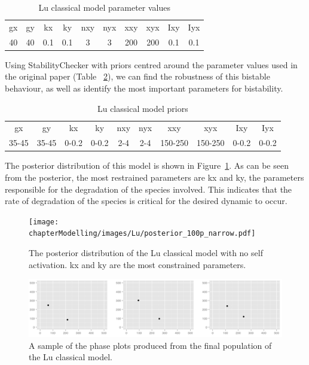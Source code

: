 \begin{table}[p]
\centering
\caption{Lu classical model parameter values}
\label{tab:lu_cl_bi}
\begin{tabular}{cccccccccc}
gx    & gy    & kx    & ky    & nxy & nyx & xxy     & xyx     & Ixy   & Iyx \\
40&40     &0.1   & 0.1   &  3  &  3  &  200    &  200    & 0.1    &   0.1
\end{tabular}
\end{table}
\clearpage

Using StabilityChecker with priors centred around the parameter values used in the original paper (Table ~\ref{tab:lu}), we can find the robustness of this bistable behaviour, as well as identify the most important parameters for bistability. 
\begin{table}[h]
\centering
\caption{Lu classical model priors}
\label{tab:lu}
\begin{tabular}{cccccccccc}
gx    & gy    & kx    & ky    & nxy & nyx & xxy     & xyx     & Ixy   & Iyx \\
35-45 & 35-45 & 0-0.2 & 0-0.2 & 2-4 & 2-4 & 150-250 & 150-250 & 0-0.2 &   0-0.2 
\end{tabular}
\end{table}

The posterior distribution of this model is shown in Figure~\ref{fig:lu_bistable}. As can be seen from the posterior, the most restrained parameters are kx and ky, the parameters responsible for the degradation of the species involved. This indicates that the rate of degradation of the species is critical for the desired dynamic to occur. 

\begin{figure}[h]
\centering
\texttt{[image: chapterModelling/images/Lu/posterior\_100p\_narrow.pdf]}
\caption[The posterior distribution of the Lu classical model with no self activation]{The posterior distribution of the Lu classical model with no self activation. kx and ky are the most constrained parameters.}
\label{fig:lu_bistable}
\end{figure}

\begin{figure}[t]
\centering
\includegraphics[scale=0.3]{chapterModelling/images/Lu/phase_plot.png}
\caption{A sample of the phase plots produced from the final population of the Lu classical model.}
\label{fig:lu_phase}
\end{figure}

